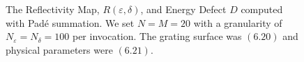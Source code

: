 %
%
\vspace{-22mm}
\begin{figure}[H]
    \centering
    \vspace{2mm}
    \caption{The Reflectivity Map, $R(\varepsilon,\delta)$, and Energy Defect $D$
    computed with Pad\'e summation. We set $N=M=20$ 
    with a granularity of $N_{\varepsilon}=N_{\delta}=100$ per invocation. The grating surface was $(6.20)$ and physical parameters were $(6.21)$.}
    \label{Fig:RM:Single Case 2}
\end{figure}